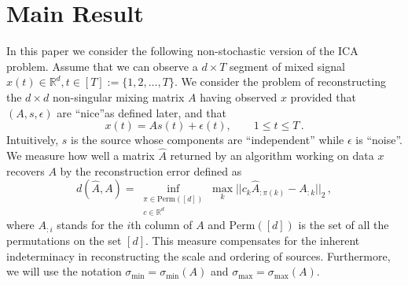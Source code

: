 \documentclass[twoside,11pt]{article}
\newcommand{\real}{\mathbb{R}}
\newcommand{\R}{\real}
\newcommand{\eps}{\epsilon}
\begin{document}
\section{Main Result}
\label{sec:main}
In this paper we consider the following non-stochastic version of the ICA problem.
Assume that we can observe a $d\times T$ segment of mixed signal $x(t) \in \R^d, t \in [T]:=\{1,2,\ldots,T\}$.
We consider the problem of reconstructing the $d\times d$ non-singular mixing matrix $A$ having observed $x$ provided that $(A,s,\eps)$ are ``nice''as defined later, and that 
\begin{equation}
\label{eq:ICA}
x(t) = As(t)+\epsilon(t), \qquad 1\le t\le T\,.
\end{equation}
Intuitively, $s$ is the source whose components are ``independent'' while $\epsilon$ is ``noise''.
We measure how well a matrix $\hat{A}$ returned by an algorithm working on data $x$ 
recovers $A$ by the reconstruction error defined as
\[
d(\hat{A}, A) = \inf_{
		\substack{\pi \in \mathrm{Perm}([d]) \\ c\in \real^d}} 
		\max_{k} || c_k \hat{A}_{:\pi(k)} - A_{:k} ||_2\,,
\]
where $A_{:i}$ stands for the $i$th column of $A$ and
$\mathrm{Perm}([d])$ is the set of all the permutations on the set $[d]$.
This measure compensates for the inherent indeterminacy in reconstructing the scale and ordering of sources.
Furthermore, we will use the notation $\sigma_{\min}=\sigma_{\min}(A)$ and
$\sigma_{\max}=\sigma_{\max}(A)$.
\end{document}
